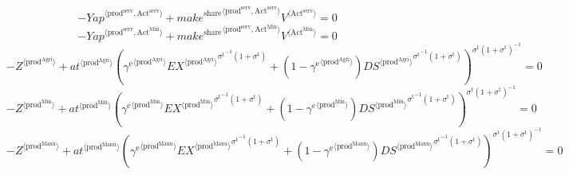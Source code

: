\begin{equation}
-{{Y\!a\!p}}^{\langle \mathrm{prod}^{\mathrm{serv}},\mathrm{Act}^{\mathrm{serv}}\rangle} + {{{m\!a\!k\!e}^{\mathrm{share}}}^{\langle \mathrm{\mathrm{prod}^{\mathrm{serv}}},\mathrm{\mathrm{Act}^{\mathrm{serv}}}\rangle}} {{V}^{\langle \mathrm{Act}^{\mathrm{serv}}\rangle}} = 0
\end{equation}
\begin{equation}
-{{Y\!a\!p}}^{\langle \mathrm{prod}^{\mathrm{serv}},\mathrm{Act}^{\mathrm{Min}}\rangle} + {{{m\!a\!k\!e}^{\mathrm{share}}}^{\langle \mathrm{\mathrm{prod}^{\mathrm{serv}}},\mathrm{\mathrm{Act}^{\mathrm{Min}}}\rangle}} {{V}^{\langle \mathrm{Act}^{\mathrm{Min}}\rangle}} = 0
\end{equation}
\begin{equation}
-{Z}^{\langle \mathrm{prod}^{\mathrm{Agri}}\rangle} + {{{a\!t}}^{\langle \mathrm{\mathrm{prod}^{\mathrm{Agri}}}\rangle}} {\left({{\gamma^{\mathrm{e}}}^{\langle \mathrm{\mathrm{prod}^{\mathrm{Agri}}}\rangle}} {{{{E\!X}}^{\langle \mathrm{prod}^{\mathrm{Agri}}\rangle}}^{{\sigma^{\mathrm{t}}}^{-1} \left(1 + \sigma^{\mathrm{t}}\right)}} + \left(1 - {\gamma^{\mathrm{e}}}^{\langle \mathrm{\mathrm{prod}^{\mathrm{Agri}}}\rangle}\right) {{{{D\!S}}^{\langle \mathrm{prod}^{\mathrm{Agri}}\rangle}}^{{\sigma^{\mathrm{t}}}^{-1} \left(1 + \sigma^{\mathrm{t}}\right)}}\right)^{{\sigma^{\mathrm{t}}} \left(1 + \sigma^{\mathrm{t}}\right)^{-1}}} = 0
\end{equation}
\begin{equation}
-{Z}^{\langle \mathrm{prod}^{\mathrm{Min}}\rangle} + {{{a\!t}}^{\langle \mathrm{\mathrm{prod}^{\mathrm{Min}}}\rangle}} {\left({{\gamma^{\mathrm{e}}}^{\langle \mathrm{\mathrm{prod}^{\mathrm{Min}}}\rangle}} {{{{E\!X}}^{\langle \mathrm{prod}^{\mathrm{Min}}\rangle}}^{{\sigma^{\mathrm{t}}}^{-1} \left(1 + \sigma^{\mathrm{t}}\right)}} + \left(1 - {\gamma^{\mathrm{e}}}^{\langle \mathrm{\mathrm{prod}^{\mathrm{Min}}}\rangle}\right) {{{{D\!S}}^{\langle \mathrm{prod}^{\mathrm{Min}}\rangle}}^{{\sigma^{\mathrm{t}}}^{-1} \left(1 + \sigma^{\mathrm{t}}\right)}}\right)^{{\sigma^{\mathrm{t}}} \left(1 + \sigma^{\mathrm{t}}\right)^{-1}}} = 0
\end{equation}
\begin{equation}
-{Z}^{\langle \mathrm{prod}^{\mathrm{Manu}}\rangle} + {{{a\!t}}^{\langle \mathrm{\mathrm{prod}^{\mathrm{Manu}}}\rangle}} {\left({{\gamma^{\mathrm{e}}}^{\langle \mathrm{\mathrm{prod}^{\mathrm{Manu}}}\rangle}} {{{{E\!X}}^{\langle \mathrm{prod}^{\mathrm{Manu}}\rangle}}^{{\sigma^{\mathrm{t}}}^{-1} \left(1 + \sigma^{\mathrm{t}}\right)}} + \left(1 - {\gamma^{\mathrm{e}}}^{\langle \mathrm{\mathrm{prod}^{\mathrm{Manu}}}\rangle}\right) {{{{D\!S}}^{\langle \mathrm{prod}^{\mathrm{Manu}}\rangle}}^{{\sigma^{\mathrm{t}}}^{-1} \left(1 + \sigma^{\mathrm{t}}\right)}}\right)^{{\sigma^{\mathrm{t}}} \left(1 + \sigma^{\mathrm{t}}\right)^{-1}}} = 0
\end{equation}
